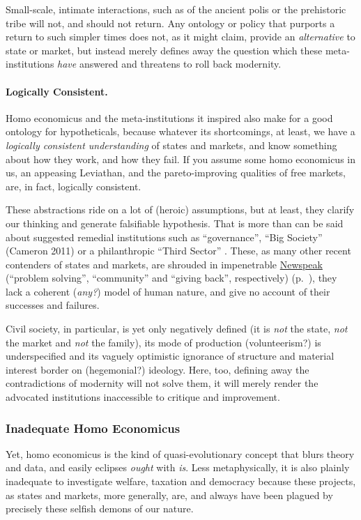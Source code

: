 {Small-scale, intimate interactions, such as of the ancient polis or the prehistoric tribe will not, and should not return. 
Any ontology or policy that purports a return to such simpler times does not, as it might claim, provide an \emph{alternative} to state or market, but instead merely defines away the question which these meta-institutions \emph{have} answered and threatens to roll back modernity.

\paragraph{Logically Consistent.} 
Homo economicus and the meta-institutions it inspired also make for a good ontology for hypotheticals, because whatever its shortcomings, at least, we have a \emph{logically consistent understanding} of states and markets, and know something about how they work, and how they fail. 
If you assume some homo economicus in us, an appeasing Leviathan, and the pareto-improving qualities of free markets, are, in fact, logically consistent. 

These abstractions ride on a lot of (heroic) assumptions, but at least, they clarify our thinking and generate falsifiable hypothesis. 
That is more than can be said about suggested remedial institutions such as ``governance'', ``Big Society'' (Cameron 2011) or a philanthropic ``Third Sector'' \citep{Anheier2002}. 
These, as many other recent contenders of states and markets, are shrouded in impenetrable \hyperref[sec:newspeak]{Newspeak} (``problem solving'', ``community'' and ``giving back'', respectively) (p.~\pageref{sec:newspeak}), they lack a coherent (\emph{any?}) model of human nature, and give no account of their successes and failures. 

Civil society, in particular, is yet only negatively defined (it is \emph{not} the state, \emph{not} the market and \emph{not} the family), its mode of production (volunteerism?) is underspecified and its vaguely optimistic ignorance of structure and material interest border on (hegemonial?) ideology. 
Here, too, defining away the contradictions of modernity will not solve them, it will merely render the advocated institutions inaccessible to critique and improvement.

\subsubsection{Inadequate Homo Economicus} 
Yet, homo economicus is the kind of quasi-evolutionary concept that blurs theory and data, and easily eclipses \emph{ought} with \emph{is}. 
Less metaphysically, it is also plainly inadequate to investigate welfare, taxation and democracy because these projects, as states and markets, more generally, are, and always have been plagued by precisely these selfish demons of our nature.

}
